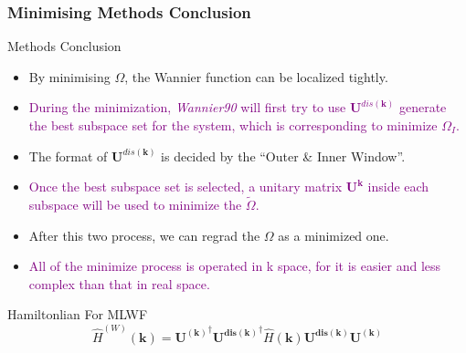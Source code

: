\documentclass{beamer}
\begin{document}
  \begin{frame}
    \frametitle{Minimising Methods Conclusion}
    \small
    \begin{block}{Methods Conclusion}
      \begin{itemize}
        \item  By minimising \(\Omega\), the Wannier function can be localized tightly.
        \item \textcolor{purple}{During the minimization, \emph{Wannier90} will first try to use \(\mathbf{U}^{dis(\mathbf{k})}\) generate the best subspace set for the system, which is corresponding to minimize \(\Omega_I\). }
        \item The format of \(\mathbf{U}^{dis(\mathbf{k})}\) is decided by the ``Outer \& Inner Window''.
        \item  \textcolor{purple}{Once the best subspace set is selected, a unitary matrix \(\mathbf{U}^{\mathbf{k}}\) inside each subspace will be used to minimize the \(\widetilde{\Omega}\).}
        \item After this two process, we can regrad the \(\Omega\) as a minimized one.
        \item \textcolor{purple}{All of the minimize process is operated in k space, for it is easier and less complex than that in real space.}
      \end{itemize}
    \end{block}

    \begin{block}{Hamiltonlian For MLWF}
      \begin{equation}
        \widehat{H}^{(W)}(\mathbf{k}) = \mathbf{U^{(\mathbf{k})}}^\dagger\mathbf{U^{dis(\mathbf{k})}}^\dagger\widehat{H}(\mathbf{k})\mathbf{U^{dis(\mathbf{k})}}\mathbf{U^{(\mathbf{k})}}
      \end{equation}
    \end{block}

  \end{frame}
\end{document}
